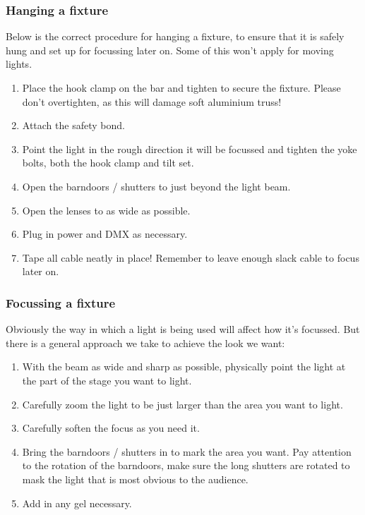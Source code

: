 \documentclass[14pt]{article} %
\let\Oldsubsubsection\subsubsection
\renewcommand{\subsubsection}{\FloatBarrier\Oldsubsubsection}
\begin{document}
\subsubsection{Hanging a fixture}
Below is the correct procedure for hanging a fixture, to ensure that it is safely hung and set up for focussing later on. Some of this won’t apply for moving lights.
\begin{enumerate}
\item	Place the hook clamp on the bar and tighten to secure the fixture. Please don’t overtighten, as this will damage soft aluminium truss!
\item	Attach the safety bond.
\item	Point the light in the rough direction it will be focussed and tighten the yoke bolts, both the hook clamp and tilt set.
\item	Open the barndoors / shutters to just beyond the light beam.
\item	Open the lenses to as wide as possible.
\item	Plug in power and DMX as necessary.
\item	Tape all cable neatly in place! Remember to leave enough slack cable to focus later on.
\end{enumerate}

\subsubsection{Focussing a fixture}

Obviously the way in which a light is being used will affect how it’s focussed. But there is a general approach we take to achieve the look we want:

\begin{enumerate}
\item	With the beam as wide and sharp as possible, physically point the light at the part of the stage you want to light.
\item	Carefully zoom the light to be just larger than the area you want to light.
\item	Carefully soften the focus as you need it.
\item	Bring the barndoors / shutters in to mark the area you want. Pay attention to the rotation of the barndoors, make sure the long shutters are rotated to mask the light that is most obvious to the audience.
\item	Add in any gel necessary.
\end{enumerate}
\end{document}
